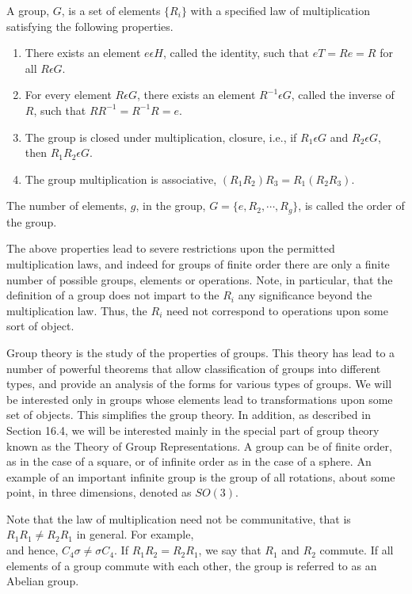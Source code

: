 A group, $G$, is a set of elements $\{R_i\}$ with a specified law of 
multiplication satisfying the following properties.
\begin{enumerate}
\item There exists an element $e \epsilon H$, called the 
identity, such that $eT = Re = R$ for all $R\epsilon G$.
\item For every element $R \epsilon G$, there exists an element 
$R^{-1}\epsilon G$, called the inverse of $R$, such that $RR^{-1} = 
R^{-1}R=e$.
\item The group is closed under multiplication, closure, i.e., 
if $R_1 \epsilon G$ and $R_2 \epsilon G$, then $R_1R_2 \epsilon G$.
\item The group multiplication is associative, $(R_1R_2)R_3 = 
R_1(R_2R_3)$.
\end{enumerate}

The number of elements, $g$, in the group, $G = \{e, R_2, \cdots, 
R_g\}$, is called the order of the group.

The above properties lead to severe restrictions upon the permitted 
multiplication laws, and indeed for groups of finite order there are 
only a finite number of possible groups, elements or operations.  Note, 
in particular, that the definition of a group does not impart to the 
$R_i$ any significance beyond the multiplication law.  Thus, the $R_i$ 
need not correspond to operations upon some sort of object.

Group theory is the study of the properties of groups. This theory has 
lead to a number of powerful theorems that allow classification of 
groups into different types, and provide an analysis of the forms for 
various types of groups.  We will be interested only in groups whose 
elements lead to transformations upon some set of objects.  This 
simplifies the group theory.  In addition, as described in Section 
16.4, we will be interested mainly in the special part of group 
theory known as the Theory of Group Representations.  A group can be of 
finite order, as in the case of a square, or of infinite order as 
in the case of a sphere.  An example of an important infinite group is 
the group of all rotations, about some point, in three dimensions, 
denoted as $SO(3)$.

Note that the law of multiplication need not be communitative, that 
is $R_1R_1 \not= R_2R_1$ in general.  For example,
\begin{equation}
\end{equation}
and hence, $C_4 \sigma \not= \sigma C_4$.  If $R_1R_2 = R_2R_1$, we 
say that $R_1$ and $R_2$ commute.  If all elements of a group commute 
with each other, the group is referred to as an Abelian group.

